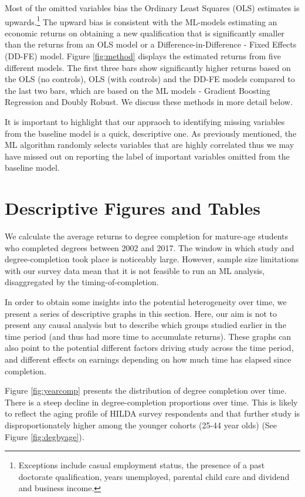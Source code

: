 \documentclass[12pt, a4paper]{article}
\begin{document}
Most of the omitted variables bias the Ordinary Least Squares (OLS) estimates is upwards.\footnote{Exceptions include casual employment status, the presence of a past doctorate qualification, years unemployed, parental child care and dividend and business income.} The upward bias is consistent with the ML-models estimating an economic returns on obtaining a new qualification that is significantly smaller than the returns from an OLS model or a Difference-in-Difference - Fixed Effects (DD-FE)  model. Figure \ref{fig:method} displays the estimated returns from five different models. The first three bars show significantly higher returns based on the OLS (no controls), OLS (with controls) and the DD-FE models compared to the last two bars, which are based on the ML models - Gradient Boosting Regression and Doubly Robust. We discuss these methods in more detail below. 

It is important to highlight that our appraoch to identifying missing variables from the baseline model is a quick, descriptive one. As previously mentioned, the ML algorithm randomly selects variables that are highly correlated thus we may have missed out on reporting the label of important variables omitted from the baseline model.



\section{Descriptive Figures and Tables}

We calculate the average returns to degree completion for mature-age students who completed degrees between 2002 and 2017. The window in which study and degree-completion took place is noticeably large. However, sample size limitations with our survey data mean that it is not feasible to run an ML analysis, disaggregated by the timing-of-completion.

In order to obtain some insights into the potential heterogeneity over time, we present a series of descriptive graphs in this section. Here, our aim is not to present any causal analysis but to describe which groups studied earlier in the time period (and thus had more time to accumulate returns). These graphs can also point to the potential different factors driving study across the time period, and different effects on earnings depending on how much time has elapsed since completion. 

Figure \ref{fig:yearcomp} presents the distribution of degree completion over time. There is a steep decline in degree-completion proportions over time. This is likely to reflect the aging profile of HILDA survey respondents and that further study is disproportionately higher among the younger cohorts (25-44 year olds) (See Figure \ref{fig:degbyage}).
\end{document}
